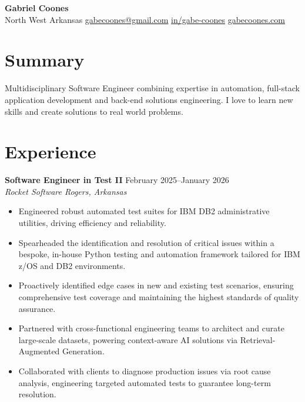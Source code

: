 \documentclass[10pt,a4paper]{article}
\begin{document}
\pagestyle{empty}

\begin{center}
{\huge \textbf{Gabriel Coones}} \\ \vspace{2mm}
North West Arkansas \textbar{} \href{mailto:gabecoones@gmail.com}{gabecoones@gmail.com} \textbar{} \href{https://linkedin.com/in/gabe-coones}{in/gabe-coones} \textbar{} \href{https://gabecoones.com}{gabecoones.com}
\end{center}

\section{Summary}
Multidisciplinary Software Engineer combining expertise in automation, full-stack application development and back-end solutions engineering. I love to learn new skills and create solutions to real world problems.

\section{Experience}
\noindent\textbf{Software Engineer in Test II} \hfill February 2025--January 2026 \\
\textit{Rocket Software \textbar{} Rogers, Arkansas}
\begin{itemize}[leftmargin=*, noitemsep, topsep=0pt]
    \item Engineered robust automated test suites for IBM DB2 administrative utilities, driving efficiency and reliability.
    \item Spearheaded the identification and resolution of critical issues within a bespoke, in-house Python testing and automation framework tailored for IBM z/OS and DB2 environments.
    \item Proactively identified edge cases in new and existing test scenarios, ensuring comprehensive test coverage and maintaining the highest standards of quality assurance.
    \item Partnered with cross-functional engineering teams to architect and curate large-scale datasets, powering context-aware AI solutions via Retrieval-Augmented Generation.
    \item Collaborated with clients to diagnose production issues via root cause analysis, engineering targeted automated tests to guarantee long-term resolution.
\end{itemize}
\vspace{2mm}
\end{document}
